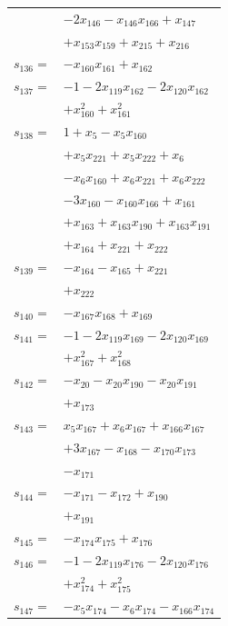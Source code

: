 \begin{longtable}{@{}r@{\;}l@{}}
 & \(\displaystyle -2x_{146} -x_{146}x_{166} +x_{147}\) \\
 & \(\displaystyle +x_{153}x_{159} +x_{215} +x_{216}\) \\[3pt]
\(s_{136}=\) & \(\displaystyle -x_{160}x_{161} +x_{162}\) \\[3pt]
\(s_{137}=\) & \(\displaystyle -1 -2x_{119}x_{162} -2x_{120}x_{162}\) \\
 & \(\displaystyle +x_{160}^{2} +x_{161}^{2}\) \\[3pt]
\(s_{138}=\) & \(\displaystyle 1 +x_{5} -x_{5}x_{160}\) \\
 & \(\displaystyle +x_{5}x_{221} +x_{5}x_{222} +x_{6}\) \\
 & \(\displaystyle -x_{6}x_{160} +x_{6}x_{221} +x_{6}x_{222}\) \\
 & \(\displaystyle -3x_{160} -x_{160}x_{166} +x_{161}\) \\
 & \(\displaystyle +x_{163} +x_{163}x_{190} +x_{163}x_{191}\) \\
 & \(\displaystyle +x_{164} +x_{221} +x_{222}\) \\[3pt]
\(s_{139}=\) & \(\displaystyle -x_{164} -x_{165} +x_{221}\) \\
 & \(\displaystyle +x_{222}\) \\[3pt]
\(s_{140}=\) & \(\displaystyle -x_{167}x_{168} +x_{169}\) \\[3pt]
\(s_{141}=\) & \(\displaystyle -1 -2x_{119}x_{169} -2x_{120}x_{169}\) \\
 & \(\displaystyle +x_{167}^{2} +x_{168}^{2}\) \\[3pt]
\(s_{142}=\) & \(\displaystyle -x_{20} -x_{20}x_{190} -x_{20}x_{191}\) \\
 & \(\displaystyle +x_{173}\) \\[3pt]
\(s_{143}=\) & \(\displaystyle x_{5}x_{167} +x_{6}x_{167} +x_{166}x_{167}\) \\
 & \(\displaystyle +3x_{167} -x_{168} -x_{170}x_{173}\) \\
 & \(\displaystyle -x_{171}\) \\[3pt]
\(s_{144}=\) & \(\displaystyle -x_{171} -x_{172} +x_{190}\) \\
 & \(\displaystyle +x_{191}\) \\[3pt]
\(s_{145}=\) & \(\displaystyle -x_{174}x_{175} +x_{176}\) \\[3pt]
\(s_{146}=\) & \(\displaystyle -1 -2x_{119}x_{176} -2x_{120}x_{176}\) \\
 & \(\displaystyle +x_{174}^{2} +x_{175}^{2}\) \\[3pt]
\(s_{147}=\) & \(\displaystyle -x_{5}x_{174} -x_{6}x_{174} -x_{166}x_{174}\) \\

\end{longtable}
